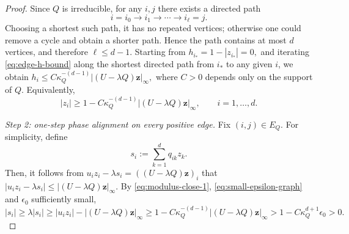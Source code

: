 \documentclass[11pt,twoside, a4paper]{article}
\numberwithin{equation}{section}
\numberwithin{figure}{section}
\theoremstyle{plain} %
\theoremstyle{definition}
\theoremstyle{remark}
\newcommand{\1} {\mspace{1 mu}}
\newcommand{\2} {\mspace{2 mu}}
\begin{document}
\begin{proof}
Since \(Q\) is irreducible, for any \(i,j\) there exists a directed path
\[
  i=i_0\to i_1\to\cdots\to i_\ell=j .
\]
Choosing a shortest such path, it has no repeated vertices; otherwise one could
remove a cycle and obtain a shorter path. Hence the path contains at most \(d\)
vertices, and therefore \(\ell\le d-1\).
Starting from
$
h_{i_*}=1-|z_{i_*}|=0,
$
and iterating \eqref{eq:edge-h-bound} along the shortest directed path from \(i_*\) to any given \(i\), we obtain
$
h_i\le C\kappa_Q^{-(d-1)}|(U-\lambda Q)\mathbf z|_\infty,
$
where \(C>0\) depends only on the support of \(Q\). Equivalently,
\begin{equation}\label{eq:modulus-close-1}
|z_i|\ge 1-C\kappa_Q^{-(d-1)}|(U-\lambda Q)\mathbf z|_\infty,
\qquad i=1,\dots,d.
\end{equation}

\medskip
\noindent\textit{Step 2: one-step phase alignment on every positive edge.}
Fix \((i,j)\in E_Q\). For simplicity, define
\[
s_i:=\sum_{k=1}^d q_{ik}z_k.
\]
Then, it follows from $u_i z_i-\lambda s_i=((U-\lambda Q)\mathbf z)_i$ that
$
|u_i z_i-\lambda s_i|\le |(U-\lambda Q)\mathbf z|_\infty.
$
By \eqref{eq:modulus-close-1}, \eqref{eq:small-epsilon-graph} and \(\epsilon_0\) sufficiently small,
\begin{equation}\label{eq:s-lowerbound}
  |s_i|\ge \lambda|s_i|\ge |u_i z_i|-|(U-\lambda Q)\mathbf z|_\infty\ge 1-C\kappa_Q^{-(d-1)}|(U-\lambda Q)\mathbf z|_\infty>1-C\kappa_Q^{d+1}\epsilon_0>0.
\end{equation}



\end{proof}
\end{document}
